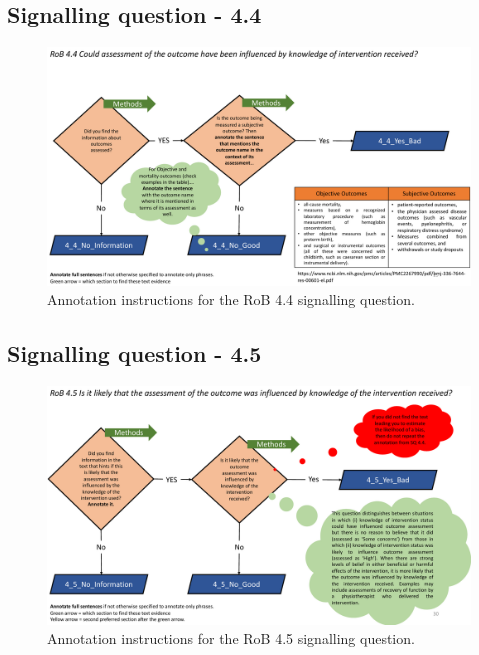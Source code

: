 \documentclass[sn-mathphys,Numbered]{sn-jnl}%
\begin{document}
\subsection*{Signalling question - 4.4 }
%
\begin{figure}[hbt]
    \centering
    \includegraphics[width=\textwidth]{figures/4_4.pdf}
    \caption{Annotation instructions for the RoB 4.4 signalling question.}
    \label{fig:4_4}
\end{figure}
%
%
%
\subsection*{Signalling question - 4.5 }
%
\begin{figure}[htbp]
    \centering
    \includegraphics[width=\textwidth]{figures/4_5.pdf}
    \caption{Annotation instructions for the RoB 4.5 signalling question.}
    \label{fig:4_5}
\end{figure}
%
%
%
\end{document}
